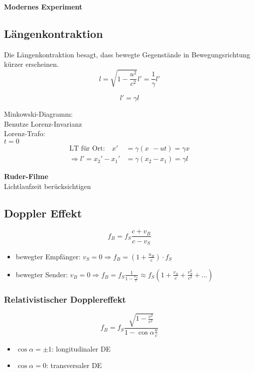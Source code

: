 \documentclass[titlepage,11pt,a4paper,ngerman]{report}
\newcommand{\tx}[1]{\textrm{#1}}
\newcommand{\frbox}[2]{\begin{tcolorbox}[colback=white,colframe=red!75!black,fonttitle=\bfseries,title=#1]#2\end{tcolorbox}}
\begin{document}
\textbf{Modernes Experiment}


\subsection{Längenkontraktion}
Die Längenkontraktion besagt, dass bewegte Gegenstände in Bewegungsrichtung kürzer erscheinen.
\begin{equation*}
l = \sqrt{1 - \frac{u^2}{c^2}} l' = \frac{1}{\gamma} l'
\end{equation*}
\frbox{Längenkontraktion}{\begin{equation*}
	l' = \gamma l
	\end{equation*}}
Minkowski-Diagramm:\\[5pt]
Benutze Lorenz-Invarianz\\
Lorenz-Trafo:\\
$ t = 0 $
\begin{align*}
\tx{LT für Ort:} \quad x' &= \gamma(x\phantom{_2} - ut) = \gamma x\\
\Rightarrow l' = x_2' - x_1' &= \gamma (x_2 - x_1) = \gamma l
\end{align*}


\textbf{Ruder-Filme}\\
Lichtlaufzeit berücksichtigen

\subsection{Doppler Effekt}
\begin{equation*}
f_B = f_S \frac{c + v_B}{c - v_S}
\end{equation*}
\begin{itemize}
	\item bewegter Empfänger: $ v_S = 0 \Rightarrow f_B = \left(1 + \frac{u_B}{c}\right) \cdot f_S $
	\item bewegter Sender: $ v_B = 0 \Rightarrow f_B = f_S \frac{1}{1 - \frac{v_S}{c}} \approx f_S \left(1 + \frac{v_S}{c} + \frac{v_S^2}{c^2} + \dots \right) $
\end{itemize}

\subsubsection{Relativistischer Dopplereffekt}
\begin{equation*}
f_B = f_S \frac{\sqrt{1 - \frac{v^2}{c^2}}}{1 - \cos \alpha \frac{u}{c}}
\end{equation*}
\begin{itemize}
	\item $ \cos \alpha = \pm 1 $: longitudinaler DE
	\item $ \cos \alpha = 0 $: transversaler DE
\end{itemize}
\end{document}
